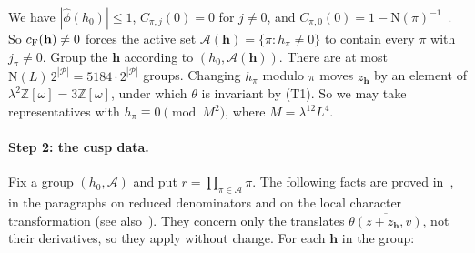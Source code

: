 \documentclass[11pt]{article}
\numberwithin{equation}{section}
\newcommand{\OO}{\mathbb Z[\omega]}
\newcommand{\N}{\mathrm N}
\begin{document}
We have $|\widehat\phi(h_0)|\le1$, $C_{\pi,j}(0)=0$ for $j\ne0$, and
$C_{\pi,0}(0)=1-\N(\pi)^{-1}$~\cite[(A.5)]{OAI1112}. So
$c_{\rm F}(\mathbf h)\ne0$ forces the active set
$\mathcal A(\mathbf h)=\{\pi:h_\pi\ne0\}$ to contain every $\pi$ with
$j_\pi\ne0$. Group the $\mathbf h$ according to
$(h_0,\mathcal A(\mathbf h))$. There are at most
$\N(L)\,2^{|\mathcal P|}=5184\cdot2^{|\mathcal P|}$ groups. Changing
$h_\pi$ modulo $\pi$ moves $z_{\mathbf h}$ by an element of
$\lambda^2\OO=3\OO$, under which $\theta$ is invariant by (T1). So we may
take representatives with $h_\pi\equiv0\pmod{M^2}$, where
$M=\lambda^{12}L^4$.

\paragraph{Step 2: the cusp data.} Fix a group $(h_0,\mathcal A)$ and put
$r=\prod_{\pi\in\mathcal A}\pi$. The following facts are proved
in~\cite[App.~A.2]{OAI1112}, in the paragraphs on reduced denominators
and on the local character transformation (see also~\cite[(5.18)]{QF}).
They concern only the translates $\overline{\theta(z+z_{\mathbf h},v)}$,
not their derivatives, so they apply without change. For each
$\mathbf h$ in the group:
\end{document}

